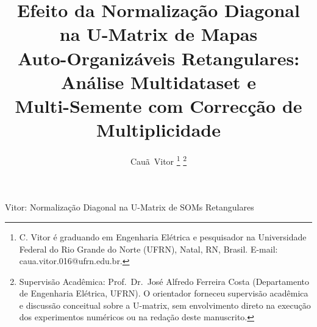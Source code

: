\documentclass[10pt,journal,compsoc,twocolumn]{IEEEtran}
\begin{document}
\title{Efeito da Normaliza\c{c}\~ao Diagonal na U-Matrix de Mapas\\
Auto-Organiz\'aveis Retangulares: An\'alise Multidataset e\\
Multi-Semente com Correc\c{c}\~ao de Multiplicidade}

\author{Cau\~a~Vitor%
\thanks{C. Vitor \'e graduando em Engenharia El\'etrica e pesquisador na
Universidade Federal do Rio Grande do Norte (UFRN), Natal, RN, Brasil.
E-mail: caua.vitor.016@ufrn.edu.br.}%
\thanks{Supervis\~ao Acad\^emica: Prof.\ Dr.\ Jos\'e Alfredo Ferreira Costa
(Departamento de Engenharia El\'etrica, UFRN). O orientador forneceu
supervis\~ao acad\^emica e discuss\~ao conceitual sobre a U-matrix, sem
envolvimento direto na execu\c{c}\~ao dos experimentos num\'ericos ou na
reda\c{c}\~ao deste manuscrito.}%
}

%
{Vitor: Normaliza\c{c}\~ao Diagonal na U-Matrix de SOMs Retangulares}

\maketitle
\end{document}
